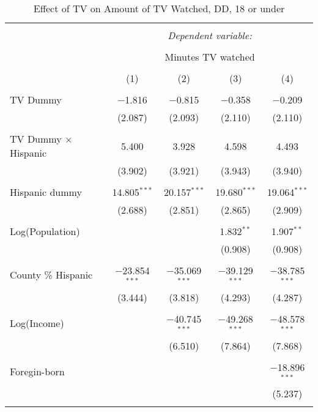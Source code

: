 
\begin{table}[!htbp] \centering 
  \caption{Effect of TV on Amount of TV Watched, DD, 18 or under} 
  \label{} 
\begin{tabular}{@{\extracolsep{-5pt}}lcccc} 
\\[-1.8ex]\hline 
\hline \\[-1.8ex] 
 & \multicolumn{4}{c}{\textit{Dependent variable:}} \\ 
\cline{2-5} 
\\[-1.8ex] & \multicolumn{4}{c}{Minutes TV watched} \\ 
\\[-1.8ex] & (1) & (2) & (3) & (4)\\ 
\hline \\[-1.8ex] 
 TV Dummy & $-$1.816 & $-$0.815 & $-$0.358 & $-$0.209 \\ 
  & (2.087) & (2.093) & (2.110) & (2.110) \\ 
  & & & & \\ 
 TV Dummy $\times$ Hispanic  & 5.400 & 3.928 & 4.598 & 4.493 \\ 
  & (3.902) & (3.921) & (3.943) & (3.940) \\ 
  & & & & \\ 
 Hispanic dummy & 14.805$^{***}$ & 20.157$^{***}$ & 19.680$^{***}$ & 19.064$^{***}$ \\ 
  & (2.688) & (2.851) & (2.865) & (2.909) \\ 
  & & & & \\ 
 Log(Population) &  &  & 1.832$^{**}$ & 1.907$^{**}$ \\ 
  &  &  & (0.908) & (0.908) \\ 
  & & & & \\ 
 County \% Hispanic & $-$23.854$^{***}$ & $-$35.069$^{***}$ & $-$39.129$^{***}$ & $-$38.785$^{***}$ \\ 
  & (3.444) & (3.818) & (4.293) & (4.287) \\ 
  & & & & \\ 
 Log(Income) &  & $-$40.745$^{***}$ & $-$49.268$^{***}$ & $-$48.578$^{***}$ \\ 
  &  & (6.510) & (7.864) & (7.868) \\ 
  & & & & \\ 
 Foregin-born &  &  &  & $-$18.896$^{***}$ \\ 
  &  &  &  & (5.237) \\ 
  & & & & \\ 

\end{tabular}
\end{table}
